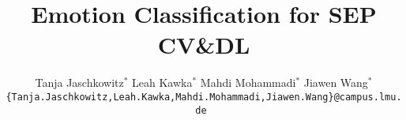 \documentclass[10pt,twocolumn,letterpaper]{article}
\title{Emotion Classification for SEP CV\&DL}
\author{
Tanja Jaschkowitz$^{*}$
\quad
Leah Kawka$^{*}$
\quad
Mahdi Mohammadi$^{*}$
\quad
Jiawen Wang$^{*}$\\
\tt\small\{Tanja.Jaschkowitz,Leah.Kawka,Mahdi.Mohammadi,Jiawen.Wang\}@campus.lmu.de
}
\begin{document}
\maketitle
%     

%  
 
{
    \small
    
    
}

% 
\end{document}
